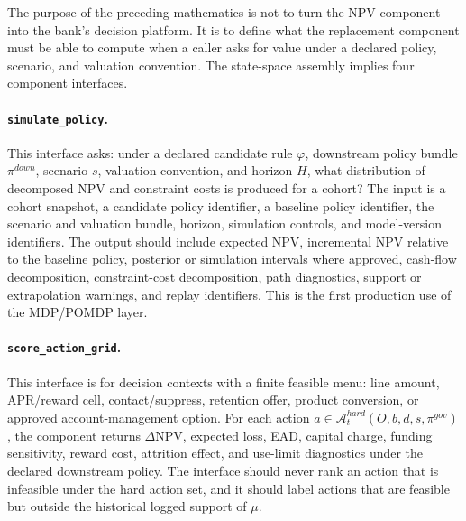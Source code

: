 \documentclass[11pt]{article}
\newcommand{\NPV}{\mathrm{NPV}}
\newcommand{\1}{\mathbf{1}}
\newcommand{\code}[1]{\nolinkurl{#1}}
\begin{document}
The purpose of the preceding mathematics is not to turn the NPV component into
the bank's decision platform. It is to define what the replacement component must
be able to compute when a caller asks for value under a declared policy,
scenario, and valuation convention. The state-space assembly implies four
component interfaces.

\paragraph{\code{simulate_policy}.}
This interface asks: under a declared candidate rule $\varphi$, downstream
policy bundle $\pi^{down}$, scenario $s$, valuation convention, and horizon $H$,
what distribution of decomposed NPV and constraint costs is produced for a
cohort? The input is a cohort snapshot, a candidate policy identifier, a baseline
policy identifier, the scenario and valuation bundle, horizon, simulation
controls, and model-version identifiers. The output should include expected NPV,
incremental NPV relative to the baseline policy, posterior or simulation
intervals where approved, cash-flow decomposition, constraint-cost
decomposition, path diagnostics, support or extrapolation warnings, and replay
identifiers. This is the first production use of the MDP/POMDP layer.

\paragraph{\code{score_action_grid}.}
This interface is for decision contexts with a finite feasible menu: line amount,
APR/reward cell, contact/suppress, retention offer, product conversion, or
approved account-management option. For each action
$a\in\mathcal{A}^{hard}_{t}(O,b,d,s,\pi^{gov})$, the component returns
$\Delta \NPV$, expected loss, EAD, capital charge, funding sensitivity, reward
cost, attrition effect, and use-limit diagnostics under the declared downstream
policy. The interface should never rank an action that is infeasible under the
hard action set, and it should label actions that are feasible but outside the
historical logged support of $\mu$.
\end{document}
